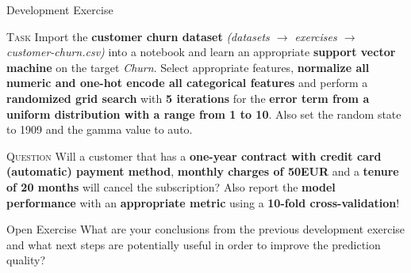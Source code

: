 \documentclass[document.tex]{subfiles}
\begin{document}
    \begin{frame}{Development Exercise }
        \begin{alertblock}{\textsc{Task}}
            Import the \textbf{customer churn dataset} \textit{(datasets $\rightarrow$ exercises $\rightarrow$ customer-churn.csv)} into a notebook and learn an appropriate \textbf{support vector machine} on the target \textit{Churn}. Select appropriate features, \textbf{normalize all numeric and one-hot encode all categorical features} and perform a \textbf{randomized grid search} with \textbf{5 iterations} for the \textbf{error term from a uniform distribution with a range from 1 to 10}. Also set the random state to 1909 and the gamma value to auto.
        \end{alertblock}
        \begin{alertblock}{\textsc{Question}}
            Will a customer that has a \textbf{one-year contract with credit card (automatic) payment method}, \textbf{monthly charges of 50EUR} and a \textbf{tenure of 20 months} will cancel the subscription? Also report the \textbf{model performance} with an \textbf{appropriate metric} using a \textbf{10-fold cross-validation}!
        \end{alertblock}
    \end{frame}

    \begin{frame}{Open Exercise }
        What are your conclusions from the previous development exercise and what next steps are potentially useful in order to improve the prediction quality?
    \end{frame}

    
\end{document}
